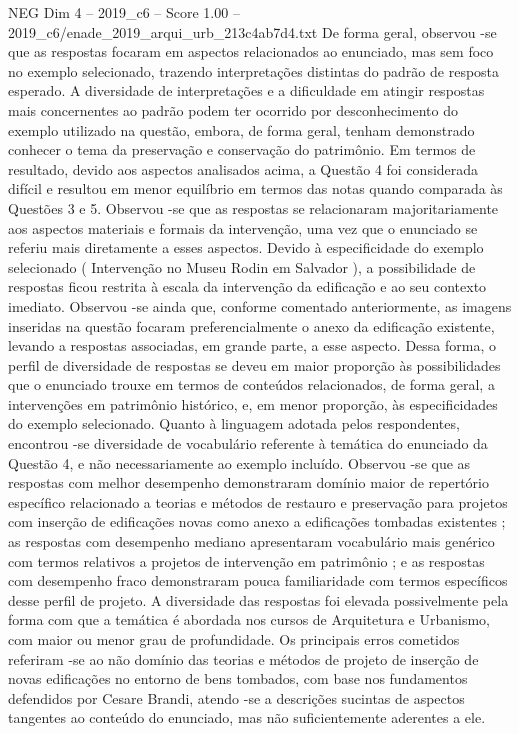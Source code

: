 \begin{textsample}{NEG Dim 4 – 2019\_c6 – Score 1.00 – 2019\_c6/enade\_2019\_arqui\_urb\_213c4ab7d4.txt}
De forma geral, observou -se que as respostas focaram em aspectos relacionados ao enunciado, mas sem foco no exemplo selecionado, trazendo interpretações distintas do padrão de resposta esperado.
A diversidade de interpretações e a dificuldade em atingir respostas mais concernentes ao padrão podem ter ocorrido por desconhecimento do exemplo utilizado na questão, embora, de forma geral, tenham demonstrado conhecer o tema da preservação e conservação do patrimônio.
Em termos de resultado, devido aos aspectos analisados acima, a Questão 4 foi considerada difícil e resultou em menor equilíbrio em termos das notas quando comparada às Questões 3 e 5.
Observou -se que as respostas se relacionaram majoritariamente aos aspectos materiais e formais da intervenção, uma vez que o enunciado se referiu mais diretamente a esses aspectos.
Devido à especificidade do exemplo selecionado ( Intervenção no Museu Rodin em Salvador ), a possibilidade de respostas ficou restrita à escala da intervenção da edificação e ao seu contexto imediato.
Observou -se ainda que, conforme comentado anteriormente, as imagens inseridas na questão focaram preferencialmente o anexo da edificação existente, levando a respostas associadas, em grande parte, a esse aspecto.
Dessa forma, o perfil de diversidade de respostas se deveu em maior proporção às possibilidades que o enunciado trouxe em termos de conteúdos relacionados, de forma geral, a intervenções em patrimônio histórico, e, em menor proporção, às especificidades do exemplo selecionado.
Quanto à linguagem adotada pelos respondentes, encontrou -se diversidade de vocabulário referente à temática do enunciado da Questão 4, e não necessariamente ao exemplo incluído.
Observou -se que as respostas com melhor desempenho demonstraram domínio maior de repertório específico relacionado a teorias e métodos de restauro e preservação para projetos com inserção de edificações novas como anexo a edificações tombadas existentes ; as respostas com desempenho mediano apresentaram vocabulário mais genérico com termos relativos a projetos de intervenção em patrimônio ; e as respostas com desempenho fraco demonstraram pouca familiaridade com termos específicos desse perfil de projeto.
A diversidade das respostas foi elevada possivelmente pela forma com que a temática é abordada nos cursos de Arquitetura e Urbanismo, com maior ou menor grau de profundidade.
Os principais erros cometidos referiram -se ao não domínio das teorias e métodos de projeto de inserção de novas edificações no entorno de bens tombados, com base nos fundamentos defendidos por Cesare Brandi, atendo -se a descrições sucintas de aspectos tangentes ao conteúdo do enunciado, mas não suficientemente aderentes a ele.

\end{textsample}
